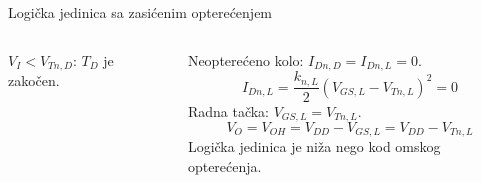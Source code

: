 \begin{frame}[label=09_1-s050]{Logička jedinica sa zasićenim opterećenjem}\setlength{\parskip}{2pt}\setlength{\abovedisplayskip}{4pt}\setlength{\belowdisplayskip}{4pt}\setlength{\abovedisplayshortskip}{3pt}\setlength{\belowdisplayshortskip}{3pt}
\begin{columns}[T,onlytextwidth]\centering {}$V_I<V_{Tn,D}$: $T_D$ je zakočen.\par Neopterećeno kolo: $I_{Dn,D}=I_{Dn,L}=0$.\[I_{Dn,L}=\frac{k_{n,L}}2(V_{GS,L}-V_{Tn,L})^2=0\]
Radna tačka: $V_{GS,L}=V_{Tn,L}$.\[V_O=V_{OH}=V_{DD}-V_{GS,L}=V_{DD}-V_{Tn,L}\]
\alert{Logička jedinica je niža nego kod omskog opterećenja.}\end{columns}
\end{frame}
